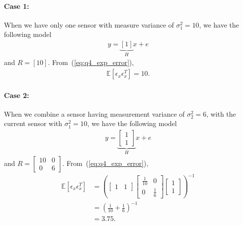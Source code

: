 \paragraph{Case 1:} When we have only one sensor with measure variance of $\sigma_1^2 = 10$, we have the following model
\begin{align*}
	y = \underbrace{[1]}_Hx + e
\end{align*}
and $R = [10]$. From~(\ref{eq:q4_exp_error}),
\begin{align*}
	\mathbb{E}[\epsilon_x \epsilon_x^T] = 10.
\end{align*}
\paragraph{Case 2:} When we combine a sensor having measurement variance of $\sigma_2^2 = 6$, with the current sensor with $\sigma_1^2 = 10$, we have the following model
\begin{align*}
y = \underbrace{\begin{bmatrix}1\\1\end{bmatrix}}_Hx + e
\end{align*}
and $R = \begin{bmatrix}10 & 0\\0 & 6\end{bmatrix}$. From~(\ref{eq:q4_exp_error}),
\begin{align*}
\mathbb{E}[\epsilon_x \epsilon_x^T] &= \left(\begin{bmatrix}1 & 1\end{bmatrix}\begin{bmatrix}\frac{1}{10} & 0\\0 & \frac{1}{6}\end{bmatrix}\begin{bmatrix}1\\1\end{bmatrix}\right)^{-1}\\
&= \left(\frac{1}{10} + \frac{1}{6}\right)^{-1}\\
&= 3.75.
\end{align*}
